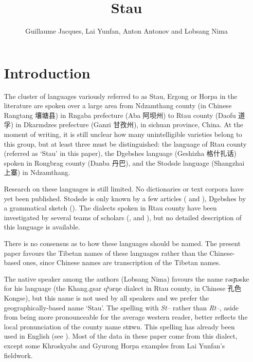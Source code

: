 \documentclass[oneside,a4paper,11pt]{article}
\newcommand{\ipa}[1]{{\phon #1}} %
\newcommand{\zh}[1]{{\cn #1}}
\begin{document}
 


\title{Stau}
\author{Guillaume Jacques, Lai Yunfan, Anton Antonov and Lobsang Nima}

\maketitle
\linenumbers
 

\section{Introduction}
The cluster of languages variously referred to as Stau, Ergong or Horpa in the literature are spoken over a large area from Ndzamthang county (in Chinese Rangtang  \zh{壤塘县})  in Rngaba  prefecture (Aba \zh{阿坝州}) to Rtau county (Daofu \zh{道孚}) in Dkarmdzes prefecture (Ganzi \zh{甘孜州}), in sichuan province, China. At the moment of writing, it is still unclear how many unintelligible varieties belong to this group, but at least three must be distinguished: the language of Rtau county (referred as `Stau' in this paper), the Dgebshes language (Geshizha \zh{格什扎话})  spoken in Rongbrag county (Danba \zh{丹巴}), and the Stodsde language (Shangzhai \zh{上寨}) in Ndzamthang.  

Research on these languages is still limited. No dictionaries or text corpora have yet been published. Stodsde is only known by a few articles (\citealt{jackson00sidaba} and   \citealt{jackson07shangzhai}), Dgebshes by a grammatical sketch (\citealt{duoerji98geshizha}). The dialects spoken in Rtau county have been investigated by several teams of scholars (\citealt{huangbf91daofu}, \citealt{sun13gexi} and \citealt{jacques14rtau}), but no detailed description of this language is available.

There is no consensus as to how these languages should be named. The present paper favours the Tibetan names of these languages rather than the Chinese-based ones, since Chinese names are transcription of the Tibetan names. 

  The native speaker among the authors (Lobsang Nima) favours the name \ipa{rəsɲəske} for his language (the Khang.gsar \ipa{qʰərŋe} dialect in Rtau county, in Chinese \zh{孔色} Kongse), but this name is not used by all speakers and we prefer the geographically-based name  `Stau'. The spelling with \textit{St--} rather than \textit{Rt--}, aside from being more pronounceable for the average western reader, better reflects the local pronunciation of the county name \ipa{stʚwu}. This spelling has already been used in English (see \citealt{wang70stau}).   Most of the data in these paper come from this dialect, except some Khroskyabs and Gyurong Horpa examples from Lai Yunfan's fieldwork.
  
\end{document}
